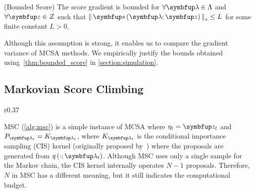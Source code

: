 \begin{assumption}{(Bounded Score)}\label{thm:bounded_score}
  The score gradient is bounded for \(\forall \vlambda \in \Lambda\) and \(\forall \vz \in \mathcal{Z}\) such that \(\norm{\vs\left(\vlambda; \vz\right)}_* \leq L \) for some finite constant \(L > 0\).
\end{assumption}
\vspace{-0.05in}
Although this assumption is strong, it enables us to compare the gradient variance of MCSA methods.
We empirically justify the bounds obtained using~\cref{thm:bounded_score} in \cref{section:simulation}.

\newpage

\vspace{-0.07in}
\subsection{Markovian Score Climbing}
\vspace{-0.07in}

\begin{wrapfigure}[9]{r}{0.37\textwidth}
\vspace{-5ex}
\begin{minipage}[c]{0.37\textwidth}
  \centering
  \begin{algorithm2e}[H]
    \DontPrintSemicolon
    \SetAlgoLined
    \caption{MSC}\label{alg:msc}
  \end{algorithm2e}
\end{minipage}
\end{wrapfigure}
%
MSC (\cref{alg:msc}) is a simple instance of MCSA where \(\eta_t = \vz_t\) and \(P_{\vlambda_t} = K_{\vlambda_t}\), where \(K_{\vlambda_t}\) is the conditional importance sampling (CIS) kernel (originally proposed by~\citet{andrieu_uniform_2018}) where the proposals are generated from \(q\left(\cdot; \vlambda_t\right)\).
Although MSC uses only a single sample for the Markov chain, the CIS kernel internally operates \(N-1\) proposals.
Therefore, \(N\) in MSC has a different meaning, but it still indicates the computational budget.


